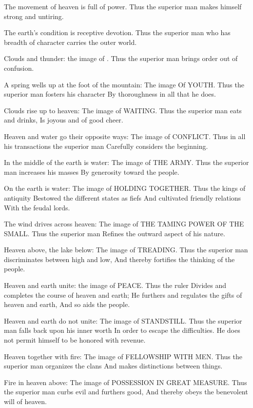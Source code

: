 {The movement of heaven is full of power.
 Thus the superior man makes himself strong and untiring.}

{The earth’s condition is receptive devotion.
 Thus the superior man who has breadth of character
 carries the outer world.}

{Clouds and thunder:
 the image of \nameit.
 Thus the superior man
 brings order out of confusion.}

{A spring wells up at the foot of the mountain:
 The image Of YOUTH.
 Thus the superior man fosters his character
 By thoroughness in all that he does.}

{Clouds rise up to heaven:
 The image of WAITING.
 Thus the superior man eats and drinks,
 Is joyous and of good cheer.}

{Heaven and water go their opposite ways:
 The image of CONFLICT.
 Thus in all his transactions the superior man
 Carefully considers the beginning.}

{In the middle of the earth is water:
 The image of THE ARMY.
 Thus the superior man increases his masses
 By generosity toward the people.}

{On the earth is water:
 The image of HOLDING TOGETHER.
 Thus the kings of antiquity
 Bestowed the different states as fiefs
 And cultivated friendly relations
 With the feudal lords.}

{The wind drives across heaven:
 The image of THE TAMING POWER OF THE SMALL.
 Thus the superior man
 Refines the outward aspect of his nature.}

{Heaven above, the lake below:
 The image of TREADING.
 Thus the superior man discriminates between high and low,
 And thereby fortifies the thinking of the people.}

{Heaven and earth unite: the image of PEACE.
 Thus the ruler
 Divides and completes the course of heaven and earth;
 He furthers and regulates the gifts of heaven and earth,
 And so aids the people.}

{Heaven and earth do not unite:
 The image of STANDSTILL.
 Thus the superior man falls back upon his inner worth
 In order to escape the difficulties.
 He does not permit himself to be honored with revenue.}

{Heaven together with fire:
 The image of FELLOWSHIP WITH MEN.
 Thus the superior man organizes the clans
 And makes distinctions between things.}

{Fire in heaven above:
 The image of POSSESSION IN GREAT
 MEASURE.
 Thus the superior man curbs evil and furthers good,
 And thereby obeys the benevolent will of heaven.}

